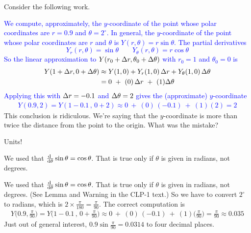 \begin{question}
Consider the following work.

\textcolor{blue}{
We compute, approximately, the $y$-coordinate of the point whose polar coordinates are $r=0.9$ and $\theta=2^\circ$. In general, the
$y$-coordinate of the point whose polar coordinates are $r$ and $\theta$
is $Y(r,\theta) = r\sin\theta$. The partial derivatives
\begin{equation*}
Y_r(r,\theta)=\sin\theta\qquad Y_\theta(r,\theta) = r\cos\theta
\end{equation*}  
So the linear approximation to $Y(r_0+\Delta r,\theta_0+\Delta\theta)$ with $r_0=1$
and $\theta_0=0$ is
\begin{align*}
Y(1+\Delta r,0+\Delta\theta)
&\approx Y(1,0) + Y_r(1,0)\,\Delta r + Y_\theta(1,0)\,\Delta\theta  \\
&= 0\ +\ (0)\,\Delta r\ +\ (1)\Delta\theta 
\end{align*}
Applying this with $\Delta r=-0.1$ and $\Delta\theta=2$ gives the (approximate)
$y$-coordinate
\begin{align*}
Y(0.9,2) = Y(1-0.1\,,\, 0+2)\approx 0\ +\ (0)\,(-0.1)\ +\ (1)(2)
         =2
\end{align*} 
}
This conclusion is ridiculous. We're saying that the $y$-coordinate is 
more than twice the distance from the point to the origin. What was the 
mistake? 

\end{question}

\begin{hint}
Units!
\end{hint}

\begin{answer}
We used that $\diff{}{\theta}\sin\theta = \cos\theta$. That is true only if $\theta$ is given in radians, not degrees.
\end{answer}

\begin{solution}
We used that $\diff{}{\theta}\sin\theta = \cos\theta$. That is true only if $\theta$ is given in radians, not degrees. 
(See Lemma  and 
Warning  in the CLP-1 text.) 
So we have to convert $2^\circ$
to radians, which is $2\times\frac{\pi}{180}=\frac{\pi}{90}$.
The correct computation is
\begin{align*}
Y\big(0.9,\tfrac{\pi}{90}\big) = Y\big(1-0.1\,,\, 0+\tfrac{\pi}{90}\big)
   \approx 0\ +\ (0)\,(-0.1)\ +\ (1)\big(\tfrac{\pi}{90}\big)
         =\tfrac{\pi}{90}
   \approx 0.035
\end{align*} 
Just out of general interest,
$
0.9\sin\tfrac{\pi}{90} =0.0314
$
to four decimal places.

\end{solution}

